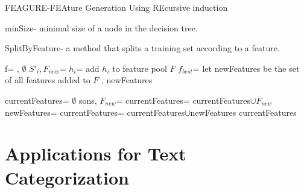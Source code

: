 \documentclass[twoside,11pt]{article}
\theoremstyle{definition}
\begin{document}
\begin{algorithm}[H]
	\caption{FEAGURE-FEAture Generation Using REcursive  induction}
	\label{code-tree-thing}
	\small
		minSize- minimal size of a node in the decision tree.

        SplitByFeature- a method that splits a training set according to a feature.
        
		\begin{algorithmic}
                \State f=  
                 
                    \State
                    \Return {}, $\emptyset$
                \EndIf
                    \State $S'_i,F_{new}$=  
                    \State $h_i$=  
                     
                        \State add $h_i$ to feature pool $F$
                    \EndIf
                \EndFor
                \State $f_{best}$=
                \State let newFeatures be the set of all features added to $F$
                \State \Return {}, newFeatures
			\EndFunction

            			
			\State 
                \State currentFeatures= $\emptyset$
                \State sons, $F_{new}$=
                \State currentFeatures= currentFeatures$\cup F_{new}$
                 
                    \State newFeatures=
                    \State currentFeatures= currentFeatures$\cup$newFeatures
                \EndFor
                \State \Return currentFeatures
			\EndFunction
		\end{algorithmic}
	\end{algorithm}

\section{Applications for Text Categorization}
\end{document}
